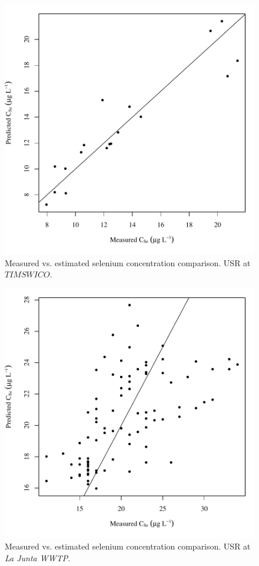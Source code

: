 \begin{figure}[htbp]
	\begin{center}
	\includegraphics[width=6in]{"Figures/Results_USR/Conc Model pred v meas TIM"}
	\caption{Measured vs. estimated selenium concentration comparison.  USR at $TIMSWICO$.}
	\end{center}
\end{figure}
\newpage

\begin{figure}[htbp]
	\begin{center}
	\includegraphics[width=6in]{"Figures/Results_USR/Conc Model pred v meas WTP"}
	\caption{Measured vs. estimated selenium concentration comparison.  USR at \textit{La Junta WWTP}.}
	\end{center}
\end{figure}
\newpage

